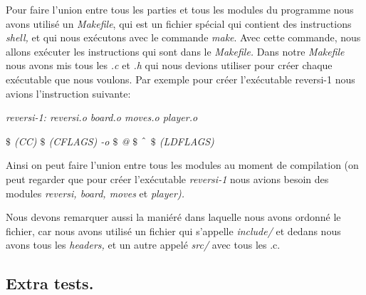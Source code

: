 \documentclass[a4paper,12pt]{article}
\begin{document}
\begin{justify}
Pour faire l’union entre tous les parties et tous les modules du programme nous avons utilisé un \textit{Makefile}, qui est un fichier spécial qui contient des instructions \textit{shell, }et qui nous exécutons avec le commande \textit{make}. Avec cette commande, nous allons exécuter les instructions qui sont dans le \textit{Makefile.} Dans notre \textit{Makefile} nous avons mis tous les \textit{.c } et \textit{.h} qui nous devions utiliser pour créer chaque exécutable que nous voulons. Par exemple pour créer l’exécutable reversi-1 nous avions l’instruction suivante: 
\end{justify}\par

\begin{Center}
\textit{reversi-1: reversi.o board.o moves.o player.o}
\end{Center}\par

\begin{Center}
\hspace*{0.49in}\hspace*{0.49in}\textit{$\$$ (CC) $\$$ (CFLAGS) -o $\$$ @ $\$$ $ \string^ $  $\$$ (LDFLAGS)}
\end{Center}\par

\begin{justify}
Ainsi on peut faire l’union entre tous les modules au moment de compilation (on peut regarder que pour créer l’exécutable \textit{reversi-1} nous avions besoin des modules \textit{reversi, board, moves }et \textit{player).}
\end{justify}\par


\begin{justify}
Nous devons remarquer aussi la maniéré dans laquelle nous avons ordonné le fichier, car nous avons utilisé un fichier qui s’appelle \textit{include/ }et dedans nous avons tous les \textit{headers, }et un autre appelé \textit{src/ }avec tous les .c.
\end{justify}\par


\vspace{\baselineskip}
	\subsection{Extra tests.}\par
\end{document}
